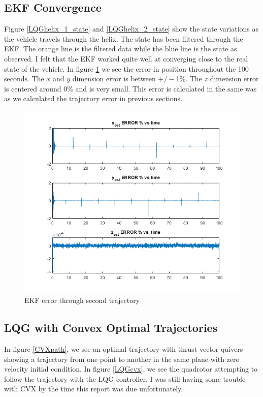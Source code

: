 \documentclass[conf]{new-aiaa}
\begin{document}
\begin{doublespace}
\begin{singlespace}
\subsection{EKF Convergence}
Figure \ref{LQGhelix_1_state} and \ref{LQGhelix_2_state} show the state variations as the vehicle travels through the helix. The state has been filtered through the EKF. The orange line is the filtered data while the blue line is the state as observed. I felt that the EKF worked quite well at converging close to the real state of the vehicle. In figure \ref{EKFerr2} we see the error in position throughout the 100 seconds. The $x$ and $y$ dimension error is between $+/-$1\%. The $z$ dimension error is centered around 0\% and is very small. This error is calculated in the same was as we calculated the trajectory error in previous sections.

\begin{figure}[!htpb]
\centering
  \includegraphics[scale= 0.6]{EKFerr2.png}
  \caption{EKF error through second trajectory}
  \label{EKFerr2}
\end{figure}

\subsection{LQG with Convex Optimal Trajectories}
In figure \ref{CVXpath}, we see an optimal trajectory with thrust vector quivers showing a trajectory from one point to another in the same plane with zero velocity initial condition. In figure \ref{LQGcvx}, we see the quadrotor attempting to follow the trajectory with the LQG controller. I was still having some trouble with CVX by the time this report was due unfortunately.


\end{singlespace}
\end{doublespace}
\end{document}
